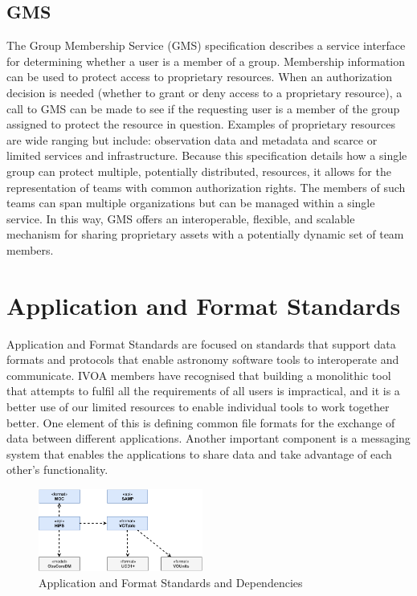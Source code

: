 \documentclass[11pt,a4paper]{ivoa}
\begin{document}
\subsection{GMS}

The Group Membership Service (GMS) specification describes a service interface for determining 
whether a user is a member of a group. Membership information can be used to protect access to 
proprietary resources. When an authorization decision is needed (whether to grant or deny access 
to a proprietary resource), a call to GMS can be made to see if the requesting user is a member 
of the group assigned to protect the resource in question. Examples of proprietary resources are 
wide ranging but include: observation data and metadata and scarce or limited services and 
infrastructure. Because this specification details how a single group can protect multiple, 
potentially distributed, resources, it allows for the representation of teams with common 
authorization rights. The members of such teams can span multiple organizations but can be 
managed within a single service. In this way, GMS offers an interoperable, flexible, and 
scalable mechanism for sharing proprietary assets with a potentially dynamic set of team members. 

\section{Application and Format Standards}

Application and Format Standards are focused on standards that support data formats and 
protocols that enable astronomy software tools to interoperate and communicate. IVOA 
members have recognised that building a monolithic tool that attempts to fulfil all the 
requirements of all users is impractical, and it is a better use of our limited resources 
to enable individual tools to work together better. One element of this is defining 
common file formats for the exchange of data between different applications. Another 
important component is a messaging system that enables the applications to share data 
and take advantage of each other's functionality.

\begin{figure}[h]
\centering
\includegraphics[width=0.48\textwidth]{ivoa-arch-apps.pdf}
\caption{Application and Format Standards and Dependencies}
\label{fig:appsdeps}
\end{figure}
\end{document}
